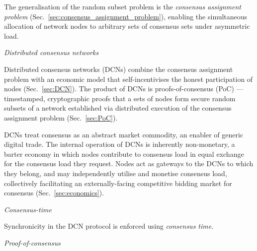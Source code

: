 The generalisation of the random subset problem is the \emph{consensus assignment problem} (Sec.~\ref{sec:consensus_assignment_problem}), enabling the simultaneous allocation of network nodes to arbitrary sets of consensus sets under asymmetric load.

\begin{center}
	\resizebox{0.3\columnwidth}{!}{}
\end{center}

\begin{center}
	\resizebox{0.3\columnwidth}{!}{}
\end{center}

\begin{center}\emph{Distributed consensus networks}\end{center}

Distributed consensus networks (DCNs) combine the consensus assignment problem with an economic model that self-incentivises the honest participation of nodes (Sec.~\ref{sec:DCN}). The product of DCNs is proofs-of-consensus (PoC) --- timestamped, cryptographic proofs that a sets of nodes form secure random subsets of a network established via distributed execution of the consensus assignment problem (Sec.~\ref{sec:PoC}).

DCNs treat consensus as an abstract market commodity, an enabler of generic digital trade. The internal operation of DCNs is inherently non-monetary, a barter economy in which nodes contribute to consensus load in equal exchange for the consensus load they request. Nodes act as gateways to the DCNs to which they belong, and may independently utilise and monetise consensus load, collectively facilitating an externally-facing competitive bidding market for consensus (Sec.~\ref{sec:economics}).

\begin{center}
	\resizebox{0.8\columnwidth}{!}{}
\end{center}

\begin{center}\emph{Consensus-time}\end{center}

Synchronicity in the DCN protocol is enforced using \emph{consensus time}.

\begin{center}\emph{Proof-of-consensus}\end{center}

\begin{center}
	\resizebox{0.5\columnwidth}{!}{}
\end{center}

